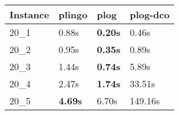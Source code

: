 \begin{tabular}{|l|l|l|l|}
\toprule
\textbf{Instance} & \textbf{plingo} &  \textbf{plog} & \textbf{plog-dco} \\
\midrule
             20_1 &           0.88s & \textbf{0.20s} &             0.46s \\
             20_2 &           0.95s & \textbf{0.35s} &             0.89s \\
             20_3 &           1.44s & \textbf{0.74s} &             5.89s \\
             20_4 &           2.47s & \textbf{1.74s} &            33.51s \\
             20_5 &  \textbf{4.69s} &          6.70s &           149.16s \\
\bottomrule
\end{tabular}
